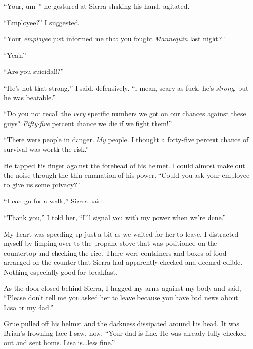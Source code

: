 ``Your, um--'' he gestured at Sierra shaking his hand, agitated.



``Employee?''  I suggested.



``Your \emph{employee} just informed me that you fought \emph{Mannequin }last night\emph{?}''



``Yeah.''



``Are you suicidal!?''



``He's not that strong,'' I said, defensively.  ``I mean, scary as fuck, he's \emph{strong}, but he was beatable.''



``Do you not recall the \emph{very} specific numbers we got on our chances against these guys?  \emph{Fifty-five} percent chance we die if we fight them!''



``There were people in danger.  \emph{My} people.  I thought a forty-five percent chance of survival was worth the risk.''



He tapped his finger against the forehead of his helmet.  I could almost make out the noise through the thin emanation of his power.  ``Could you ask your employee to give us some privacy?''



``I can go for a walk,'' Sierra said.



``Thank you,'' I told her, ``I'll signal you with my power when we're done.''



My heart was speeding up just a bit as we waited for her to leave.  I distracted myself by limping over to the propane stove that was positioned on the countertop and checking the rice.  There were containers and boxes of food arranged on the counter that Sierra had apparently checked and deemed edible.  Nothing especially good for breakfast.



As the door closed behind Sierra, I hugged my arms against my body and said, ``Please don't tell me you asked her to leave because you have bad news about Lisa or my dad.''



Grue pulled off his helmet and the darkness dissipated around his head.  It was Brian's frowning face I saw, now.  ``Your dad is fine.  He was already fully checked out and sent home.  Lisa is\ldots less fine.''



